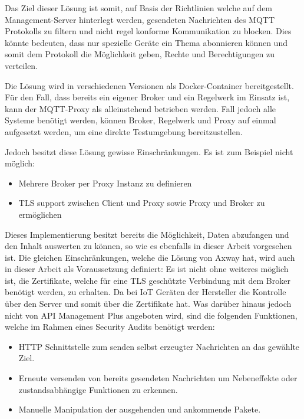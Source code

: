     Das Ziel dieser Lösung ist somit, auf Basis der Richtlinien welche auf dem Management-Server hinterlegt werden, gesendeten Nachrichten des \ac{MQTT} Protokolls zu filtern und nicht regel konforme Kommunikation zu blocken. Dies könnte bedeuten, dass nur spezielle Geräte ein Thema abonnieren können und somit dem Protokoll die Möglichkeit geben, Rechte und Berechtigungen zu verteilen.
    
    Die Lösung wird in verschiedenen Versionen als Docker-Container bereitgestellt. Für den Fall, dass bereits ein eigener Broker und ein Regelwerk im Einsatz ist, kann der \ac{MQTT}-Proxy als alleinstehend betrieben werden. Fall jedoch alle Systeme benötigt werden, können Broker, Regelwerk und Proxy auf einmal aufgesetzt werden, um eine direkte Testumgebung bereitzustellen.
    
    Jedoch besitzt diese Lösung gewisse Einschränkungen.
    Es ist zum Beispiel nicht möglich:
    \begin{itemize}
        \item Mehrere Broker per Proxy Instanz zu definieren
        \item TLS support zwischen Client und Proxy sowie Proxy und Broker zu ermöglichen
    \end{itemize}
    
    Dieses Implementierung besitzt bereits die Möglichkeit, Daten abzufangen und den Inhalt auswerten zu können, so wie es ebenfalls in dieser Arbeit vorgesehen ist. Die gleichen Einschränkungen, welche die Lösung von Axway hat, wird auch in dieser Arbeit als Voraussetzung definiert: Es ist nicht ohne weiteres möglich ist, die Zertifikate, welche für eine TLS geschützte Verbindung mit dem Broker benötigt werden, zu erhalten. Da bei \ac{IoT} Geräten der Hersteller die Kontrolle über den Server und somit über die Zertifikate hat.
    Was darüber hinaus jedoch nicht von API Management Plus angeboten wird, sind die folgenden Funktionen, welche im Rahmen eines Security Audits benötigt werden: 
    \begin{itemize}
        \item HTTP Schnittstelle zum senden selbst erzeugter Nachrichten an das gewählte Ziel.
        \item Erneute versenden von bereits gesendeten Nachrichten um Nebeneffekte oder zustandsabhängige Funktionen zu erkennen.
        \item Manuelle Manipulation der ausgehenden und ankommende Pakete.
    \end{itemize}
